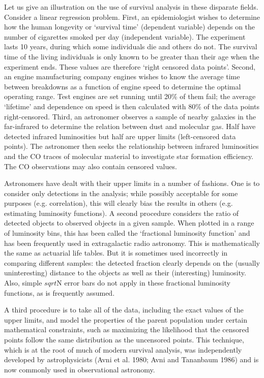      Let us give an illustration on the use of survival analysis in these
disparate fields.  Consider a linear regression problem.   First, an 
epidemiologist wishes to determine how the human longevity or `survival time' 
(dependent variable) depends on the number of cigarettes smoked per day 
(independent variable).  The experiment lasts 10 years, during which some 
individuals die  and others do not. The survival time of the living 
individuals is only known to be greater than their age when the experiment
ends. These values are therefore `right censored data points'.  Second, 
an engine manufacturing company engines wishes to know the average time 
between breakdowns as a function of engine speed to determine the optimal
operating range.  Test engines are set running until 20\% of them fail; 
the average `lifetime' and dependence on speed is then calculated with 
80\% of the data points right-censored.  Third, an astronomer observes a sample
of nearby galaxies in the far-infrared to determine the relation between 
dust and molecular gas.  Half have detected infrared luminosities  but 
half are upper limits (left-censored data points).  The astronomer then seeks
the relationship between infrared luminosities and the CO traces of molecular
material to investigate star formation efficiency.  The CO observations may 
also contain censored values.
 
     Astronomers have dealt with their upper limits in a number of
fashions.  One is to consider only detections in the analysis; while
possibly acceptable for some purposes (e.g. correlation),  this will 
clearly bias the results in others (e.g. estimating  luminosity functions).
A second procedure considers the ratio of detected objects to observed 
objects in a given sample. When plotted in a range of luminosity bins, 
this has been called the `fractional luminosity function' and has been 
frequently used in extragalactic radio astronomy.  This is mathematically 
the same as actuarial life tables.  But it is sometimes used incorrectly 
in comparing different samples:  the detected fraction clearly depends on 
the (usually uninteresting) distance to the objects as well as their
(interesting)  luminosity.  Also, simple $sqrt$N error bars do not
apply in these fractional luminosity functions, as is frequently assumed. 
 
     A third procedure is to take all of the data, including the exact
values of the upper limits, and model the properties of   the parent
population under certain mathematical constraints, such as maximizing 
the likelihood that the censored points follow the same distribution as the
uncensored points.  This technique, which is at the root of much of modern 
survival analysis, was independently developed by astrophysicists (Avni et al.
1980; Avni and Tananbaum 1986) and is now commonly used in observational
astronomy. 

